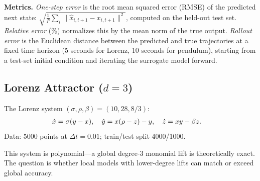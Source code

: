 \documentclass[11pt]{article}
\theoremstyle{definition}
\begin{document}
\textbf{Metrics.} \emph{One-step error} is the root mean squared error (RMSE) of the predicted next state: $\sqrt{\frac{1}{P}\sum_i \|\hat{x}_{i,t+1} - x_{i,t+1}\|^2}$, computed on the held-out test set. \emph{Relative error} (\%) normalizes this by the mean norm of the true output. \emph{Rollout error} is the Euclidean distance between the predicted and true trajectories at a fixed time horizon (5 seconds for Lorenz, 10 seconds for pendulum), starting from a test-set initial condition and iterating the surrogate model forward.

\subsection{Lorenz Attractor ($d=3$)}

The Lorenz system $(\sigma, \rho, \beta) = (10, 28, 8/3)$:
\begin{align}
  \dot{x} &= \sigma(y - x), \quad \dot{y} = x(\rho - z) - y, \quad \dot{z} = xy - \beta z. \notag
\end{align}
Data: 5000 points at $\Delta t = 0.01$; train/test split 4000/1000.

This system is polynomial---a global degree-3 monomial lift is theoretically exact. The question is whether local models with lower-degree lifts can match or exceed global accuracy.
\end{document}
